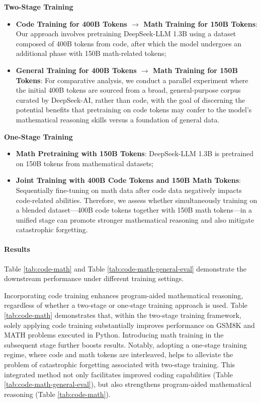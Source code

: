 \begin{itemize}[topsep=0pt]
\begin{itemize}[topsep=0pt]
\textbf{Two-Stage Training}

\begin{itemize}[topsep=0pt]
    \item \textbf{Code Training for 400B Tokens $\rightarrow$ Math Training for 150B Tokens}: Our approach involves pretraining DeepSeek-LLM 1.3B using a dataset composed of 400B tokens from code, after which the model undergoes an additional phase with 150B math-related tokens;
    \item \textbf{General Training for 400B Tokens $\rightarrow$ Math Training for 150B Tokens}: For comparative analysis, we conduct a parallel experiment where the initial 400B tokens are sourced from a broad, general-purpose corpus curated by DeepSeek-AI, rather than code, with the goal of discerning the potential benefits that pretraining on code tokens may confer to the model's mathematical reasoning skills versus a foundation of general data.
\end{itemize}

\textbf{One-Stage Training}

\begin{itemize}[topsep=0pt]
    \item \textbf{Math Pretraining with 150B Tokens}: DeepSeek-LLM 1.3B is pretrained on 150B tokens from mathematical datasets;
    \item \textbf{Joint Training with 400B Code Tokens and 150B Math Tokens}: Sequentially fine-tuning on math data after code data negatively impacts code-related abilities. Therefore, we assess whether simultaneously training on a blended dataset—400B code tokens together with 150B math tokens—in a unified stage can promote stronger mathematical reasoning and also mitigate catastrophic forgetting.
\end{itemize}

\paragraph{Results}
Table \ref{tab:code-math} and Table \ref{tab:code-math-general-eval} demonstrate the downstream performance under different training settings.

Incorporating code training enhances program-aided mathematical reasoning, regardless of whether a two-stage or one-stage training approach is used. Table \ref{tab:code-math} demonstrates that, within the two-stage training framework, solely applying code training substantially improves performance on GSM8K and MATH problems executed in Python. Introducing math training in the subsequent stage further boosts results. Notably, adopting a one-stage training regime, where code and math tokens are interleaved, helps to alleviate the problem of catastrophic forgetting associated with two-stage training. This integrated method not only facilitates improved coding capabilities (Table \ref{tab:code-math-general-eval}), but also strengthens program-aided mathematical reasoning (Table \ref{tab:code-math}).


\end{itemize}
\end{itemize}
